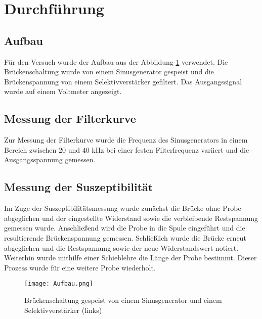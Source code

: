 \section{Durchführung}
\subsection{Aufbau}
Für den Versuch wurde der Aufbau aus der Abbildung \ref{fig:block} verwendet. Die Brückenschaltung wurde von einem Sinusgenerator gespeist und die Brückenspannung von einem Selektivverstärker gefiltert. Das Ausgangssignal wurde auf einem Voltmeter angezeigt.
\subsection{Messung der Filterkurve}
Zur Messung der Filterkurve wurde die Frequenz des Sinusgenerators in einem Bereich zwischen $20$ und $40$ kHz bei einer festen Filterfrequenz variiert und die Ausgangsspannung gemessen.
\subsection{Messung der Suszeptibilität}
Im Zuge der Suszeptibilitätsmessung wurde zunächst die Brücke ohne Probe abgeglichen und der eingestellte Widerstand
sowie die verbleibende Restspannung gemessen wurde. Anschließend wird die Probe in die Spule eingeführt und die resultierende Brückenspannung gemessen. Schließlich wurde die Brücke erneut abgeglichen und die Restspannung sowie der neue Widerstandswert notiert. Weiterhin wurde mithilfe einer Schieblehre die Länge der Probe bestimmt. Dieser Prozess wurde für eine weitere Probe wiederholt.
\begin{figure}[h]
    \label{fig:block}
    \centering
    \texttt{[image: Aufbau.png]}
    \caption{Brückenschaltung gespeist von einem Sinusgenerator und einem Selektivverstärker (links)}
\end{figure}
